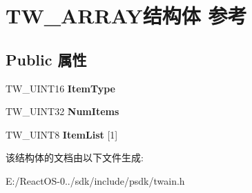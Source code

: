 \hypertarget{struct_t_w___a_r_r_a_y}{}\section{T\+W\+\_\+\+A\+R\+R\+A\+Y结构体 参考}
\label{struct_t_w___a_r_r_a_y}
\subsection*{Public 属性}
\begin{DoxyCompactItemize}
\item 
\mbox{\label{struct_t_w___a_r_r_a_y_abdee9592d4125427e7382c9b2217e0a9}} 
T\+W\+\_\+\+U\+I\+N\+T16 {\bfseries Item\+Type}
\item 
\mbox{\label{struct_t_w___a_r_r_a_y_a1232ba31c6175295e2db362761392652}} 
T\+W\+\_\+\+U\+I\+N\+T32 {\bfseries Num\+Items}
\item 
\mbox{\label{struct_t_w___a_r_r_a_y_ab98baf5ef8275c04021155fe6c663cfb}} 
T\+W\+\_\+\+U\+I\+N\+T8 {\bfseries Item\+List} \mbox{[}1\mbox{]}
\end{DoxyCompactItemize}


该结构体的文档由以下文件生成\+:\begin{DoxyCompactItemize}
\item 
E\+:/\+React\+O\+S-\/0../sdk/include/psdk/twain.\+h\end{DoxyCompactItemize}
